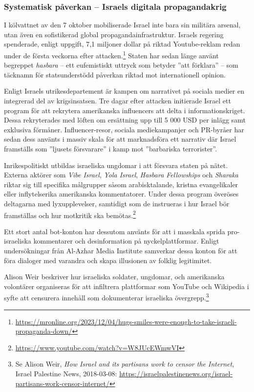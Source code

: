 \subsubsection{Systematisk påverkan – Israels digitala propagandakrig}

I kölvattnet av den 7 oktober mobiliserade Israel inte bara sin militära arsenal, utan även en sofistikerad global propagandainfrastruktur. Israels regering spenderade, enligt uppgift, 7,1 miljoner dollar på riktad Youtube-reklam redan under de första veckorna efter attacken.\footnote{\url{https://mronline.org/2023/12/04/hugs-smiles-were-enough-to-take-israeli-propaganda-down/}} Staten har sedan länge använt begreppet \textit{hasbara} – ett eufemistiskt uttryck som betyder ”att förklara” – som täcknamn för statsunderstödd påverkan riktad mot internationell opinion.

Enligt Israels utrikesdepartement är kampen om narrativet på sociala medier en integrerad del av krigsinsatsen. Tre dagar efter attacken initierade Israel ett program för att rekrytera amerikanska influencers att delta i informationskriget. Dessa rekryterades med löften om ersättning upp till 5 000 USD per inlägg samt exklusiva förmåner. Influencer-resor, sociala mediekampanjer och PR-byråer har sedan dess använts i massiv skala för att marknadsföra ett narrativ där Israel framställs som ”ljusets försvarare” i kamp mot ”barbariska terrorister”.

Inrikespolitiskt utbildas israeliska ungdomar i att försvara staten på nätet. Externa aktörer som \textit{Vibe Israel}, \textit{Yola Israel}, \textit{Hasbara Fellowships} och \textit{Sharaka} riktar sig till specifika målgrupper såsom arabisktalande, kristna evangelikaler eller inflytelserika amerikanska kommentatorer. Under dessa program överöses deltagarna med lyxupplevelser, samtidigt som de instrueras i hur Israel bör framställas och hur motkritik ska bemötas.\footnote{\url{https://www.youtube.com/watch?v=W8JUcEWmwVI}}

Ett stort antal bot-konton har dessutom använts för att i masskala sprida pro-israeliska kommentarer och desinformation på nyckelplattformar. Enligt undersökningar från Al-Azhar Media Institute samverkar dessa konton för att föra dialoger med varandra och skapa illusionen av folklig legitimitet.

Alison Weir beskriver hur israeliska soldater, ungdomar, och amerikanska volontärer organiseras för att infiltrera plattformar som YouTube och Wikipedia i syfte att censurera innehåll som dokumenterar israeliska övergrepp.\footnote{Se Alison Weir, \textit{How Israel and its partisans work to censor the Internet}, Israel Palestine News, 2018-03-08: \url{https://israelpalestinenews.org/israel-partisans-work-censor-internet/}}


